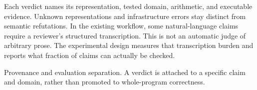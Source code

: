 Each verdict names its representation, tested domain, arithmetic, and executable
evidence. Unknown representations and infrastructure errors stay distinct from
semantic refutations. In the existing workflow, some natural-language claims
require a reviewer's structured transcription. This is not an automatic judge of
arbitrary prose. The experimental design measures that transcription burden and
reports what fraction of claims can actually be checked.

{Provenance and evaluation separation. A verdict is attached to a specific claim
and domain, rather than promoted to whole-program correctness.}
